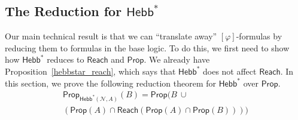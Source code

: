 \documentclass[letterpaper]{article}
\theoremstyle{definition}
\newcommand{\Net}{\mathcal{N}}
\newcommand{\Prop}{\mathsf{Prop}}
\newcommand{\Reach}{\mathsf{Reach}}
\newcommand{\Hebbstar}[2]{\mathsf{Hebb}^*(#1, #2)}
\newcommand{\HebbstarNoArgs}{\mathsf{Hebb}^*}
\newcommand{\Hebbop}[1]{[#1]}
\begin{document}
\subsection{The Reduction for $\HebbstarNoArgs$}

Our main technical result is that we can ``translate away'' $\Hebbop{\varphi}$-formulas by reducing them to formulas in the base logic.  To do this, we first need to show how $\HebbstarNoArgs$ reduces to $\Reach$ and $\Prop$.  We already have Proposition~\ref{hebbstar_reach}, which says that $\HebbstarNoArgs$ does not affect $\Reach$.  In this section, we prove the following reduction theorem for $\HebbstarNoArgs$ over $\Prop$.
\begin{multline}\label{reduction}
    \Prop_{\Hebbstar{\Net}{A}}(B) = \Prop(B\ \cup \\
    (\Prop(A) \cap \Reach(\Prop(A) \cap \Prop(B)))) \tag{$\dagger$}
\end{multline}

\end{document}
